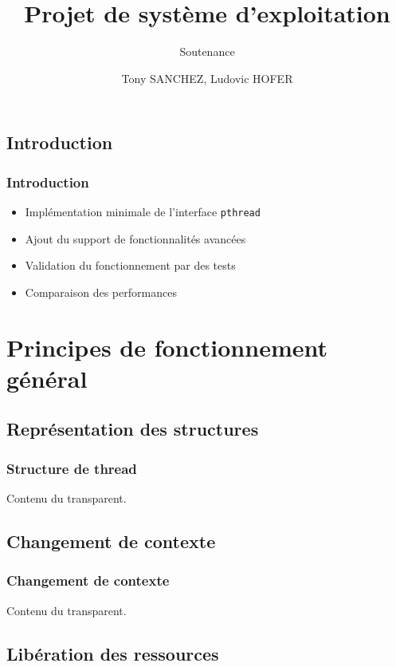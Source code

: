 \documentclass{beamer}
\title{Projet de système d'exploitation}
\subtitle{Soutenance}
\author{Tony SANCHEZ, Ludovic HOFER}
\institute{ENSERIB-MATMECA}
\begin{document}
 
\maketitle

\tableofcontents
 
\begin{frame}
\section{Introduction}
\frametitle{Introduction}

\begin{itemize}
\item Implémentation minimale de l'interface \verb!pthread!
\item Ajout du support de fonctionnalités avancées
\item Validation du fonctionnement par des tests
\item Comparaison des performances
\end{itemize}
 
\end{frame}

\section{Principes de fonctionnement général}
\subsection{Représentation des structures}

\begin{frame}
\frametitle{Structure de thread}
 
Contenu du transparent.
 
\end{frame}

\subsection{Changement de contexte}

\begin{frame}
  \frametitle{Changement de contexte}
  Contenu du transparent.

\end{frame}

\subsection{Libération des ressources}
\end{document}
